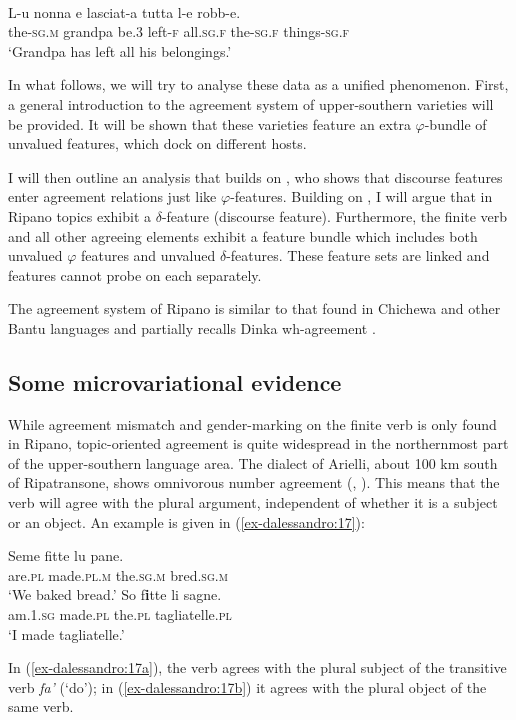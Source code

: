 \documentclass[output=paper
,modfonts
,nonflat]{langsci/langscibook}
\begin{document}
\begin{exe}
	\ex \label{ex-dalessandro:16}	\citet[140]{Rossi2008}\\
	\gll L-u   nonna   e   lasciat-a tutta   l-e   robb-e.\\
	the-\textsc{sg.m} grandpa  be.3  left-\textsc{f} all.\textsc{sg.f} the-\textsc{sg.f} things-\textsc{sg.f}\\
	\glt `Grandpa has left all his belongings.'
\end{exe}
In what follows, we will try to analyse these data as a unified phenomenon. First, a general introduction to the agreement system of upper-southern varieties will be provided. It will be shown that these varieties feature an extra $\varphi $-bundle of unvalued features, which dock on different hosts.

I will then outline an analysis that builds on \citet{Miyagawa2017}, who shows that discourse features enter agreement relations just like $\varphi$-features. Building on \citet{Miyagawa2017}, I will argue that in Ripano topics exhibit a $\delta$-feature (discourse feature). Furthermore, the finite verb and all other agreeing elements exhibit a feature bundle which includes both unvalued $\varphi $ features and unvalued $\delta$-features.  These feature sets are linked and features cannot probe on each separately. 

The agreement system of Ripano is similar to that found in Chichewa and other Bantu languages \citep{Bresnan_Mchombo1987} and partially recalls Dinka wh-agreement \citep{Van_Urk2015}.

\subsection{Some microvariational evidence} \label{sec-dalessandro:2.3}
While agreement mismatch and gender-marking on the finite verb is only found in Ripano, topic-oriented agreement is quite widespread in the northernmost part of the upper-southern language area. The dialect of Arielli, about 100 km south of Ripatransone, shows omnivorous number agreement (\citealt{D`Alessandro_Roberts2010}, \citealt{D`Alessandro2017}). This means that the verb will agree with the plural argument, independent of whether it is a subject or an object. An example is given in (\ref{ex-dalessandro:17}):

\begin{exe} 
	\ex \label{ex-dalessandro:17} \xlist
	\ex   \label{ex-dalessandro:17a}
	\gll Seme   fitte   lu   pane.\\
	are.\textsc{pl} made.\textsc{pl.m} the.\textsc{sg.m} bred.\textsc{sg.m}\\
	\glt `We baked bread.' 
	\ex \label{ex-dalessandro:17b}
	\gll  So     f\textbf{i}tte   li         sagne.\\ 
	am.\textsc{1.sg} made.\textsc{pl} the.\textsc{pl} tagliatelle.\textsc{pl}\\ 
	\glt `I made tagliatelle.'
	\endxlist
\end{exe}
In (\ref{ex-dalessandro:17a}), the verb agrees with the plural subject of the transitive verb \textit{fa’} (‘do’); in (\ref{ex-dalessandro:17b}) it agrees with the plural object of the same verb. 
\end{document}
